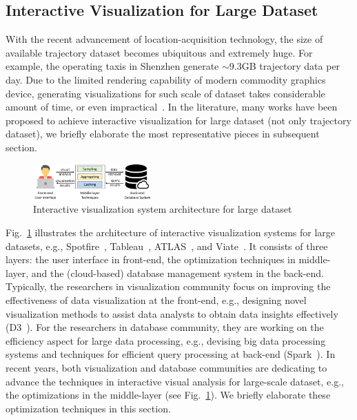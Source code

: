 \subsection{Interactive Visualization for Large Dataset}\label{sec:interactive}
{With the recent advancement of location-acquisition technology, the size of available trajectory dataset becomes ubiquitous and extremely huge.}
For example, the operating taxis in Shenzhen generate {$\sim$}9.3GB trajectory data per day.
Due to the limited rendering capability of modern commodity graphics device, generating visualizations for such scale of dataset takes considerable amount of time,
or even impractical~\cite{park2016visualization}.
In the literature, many works have been proposed to achieve interactive visualization {for} large dataset (not only trajectory dataset),
we briefly elaborate the most representative pieces in subsequent section. %

\begin{figure}
	\centering
	\includegraphics[width=0.40\textwidth]{pictures/framework/framework.pdf}
	\vspace{-3mm}
	\caption{Interactive visualization system architecture for large dataset} \label{fig:framework}
    \vspace{-6mm}
\end{figure}

Fig.~\ref{fig:framework} illustrates the architecture of interactive visualization systems for large datasets,
e.g., Spotfire~\cite{Spotfire}, Tableau~\cite{Tableau}, ATLAS~\cite{chan2008maintaining}, and Viate~\cite{yang2019vaite}.
{It} consists of three layers: the user interface in front-end, the optimization techniques in middle-layer, and the (cloud-based) database management system in the back-end.
{Typically, the researchers in visualization community focus on improving the effectiveness of data visualization at the front-end,
e.g., designing novel visualization methods to assist data analysts to obtain data insights effectively (D3~\cite{d3}).}
For the researchers in database community, they are working on the efficiency aspect for large data processing, e.g., devising big data processing systems and techniques for efficient query processing at back-end (Spark~\cite{spark}).
In recent years, both visualization and database communities are dedicating to advance the techniques in interactive visual analysis for large-scale dataset,
e.g., the optimizations in the middle-layer (see Fig.~\ref{fig:framework}).
We briefly elaborate these optimization techniques {in this section}. %

